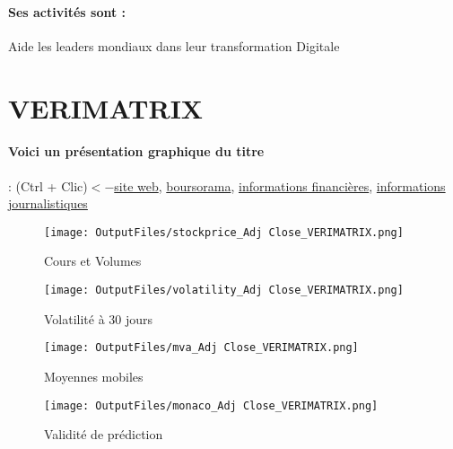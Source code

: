 \documentclass[11pt,a4paper]{report}%
\begin{document}
\paragraph{Ses activités sont : } Aide les leaders mondiaux dans leur transformation Digitale 
    
    \newpage

\section{VERIMATRIX}

\paragraph{Voici un présentation graphique du titre} : (Ctrl + Clic)$<-$\href{https://www.verimatrix-finance.com/}{site web}, \href{https://www.boursorama.com/cours/1rPVMX}{boursorama}, \href{https://www.qwant.com/?q=site:https:%2f%2fwww.easybourse.com%2faction-societe%2fVERIMATRIX&t=web&client=ext-firefox-hp}{informations financières}, \href{https://bourse.lerevenu.com/cours-de-bourse/fiche-valeur-synthese/VERIMATRIX/VMX-FR}{informations journalistiques}
\begin{figure}[!htb]
   \begin{minipage}{0.5\textwidth}
     \centering
     \texttt{[image: OutputFiles/stockprice\_Adj Close\_VERIMATRIX.png]}
     \caption{Cours et Volumes}\label{Fig:price_VERIMATRIX}
   \end{minipage}\hfill
   \begin{minipage}{0.5\textwidth}
     \centering
     \texttt{[image: OutputFiles/volatility\_Adj Close\_VERIMATRIX.png]}
     \caption{Volatilité à 30 jours}\label{Fig:volat_VERIMATRIX}
   \end{minipage}
\end{figure}
\begin{figure}[!htb]
   \begin{minipage}{0.5\textwidth}
     \centering
     \texttt{[image: OutputFiles/mva\_Adj Close\_VERIMATRIX.png]}
     \caption{Moyennes mobiles}\label{Fig:mva_VERIMATRIX}
   \end{minipage}\hfill
   \begin{minipage}{0.5\textwidth}
     \centering
     \texttt{[image: OutputFiles/monaco\_Adj Close\_VERIMATRIX.png]}
     \caption{Validité de prédiction}\label{Fig:prediction_VERIMATRIX}
   \end{minipage}
\end{figure}
\end{document}
